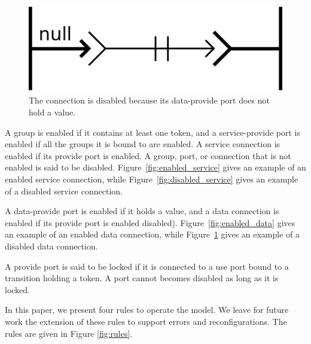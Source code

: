 \begin{figure}[t]
\begin{center}
  \includegraphics[width=0.4\columnwidth]{./images/disabled_data.pdf}
\end{center}
\caption{The connection is disabled because its data-provide port does not hold a value.}
\label{fig:disabled_data}
\end{figure}

A group is enabled if it contains at least one token, and a
service-provide port is enabled if all the groups it is bound to are
enabled. A service connection is enabled if its provide port is
enabled. A group, port, or connection that is not enabled is said to
be disabled. Figure~\ref{fig:enabled_service} gives an example of an
enabled service connection, while Figure~\ref{fig:disabled_service}
gives an example of a disabled service connection.

A data-provide port is enabled if it holds a value, and a data
connection is enabled if its provide port is enabled disabled).
Figure~\ref{fig:enabled_data} gives an example of an enabled data
connection, while Figure~\ref{fig:disabled_data} gives an example of a
disabled data connection.

A provide port is said to be locked if it is connected to a use port
bound to a transition holding a token. A port cannot becomes disabled
as long as it is locked.
    
In this paper, we present four rules to operate the \mad model. We
leave for future work the extension of these rules to support errors
and reconfigurations. The rules are given in Figure \ref{fig:rules}.

